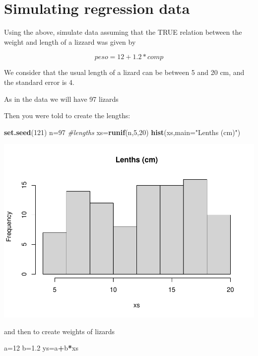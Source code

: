 \documentclass[
]{book}
\newenvironment{Shaded}{\begin{snugshade}}{\end{snugshade}}
\newcommand{\CommentTok}[1]{\textcolor[rgb]{0.56,0.35,0.01}{\textit{#1}}}
\newcommand{\DataTypeTok}[1]{\textcolor[rgb]{0.13,0.29,0.53}{#1}}
\newcommand{\DecValTok}[1]{\textcolor[rgb]{0.00,0.00,0.81}{#1}}
\newcommand{\FloatTok}[1]{\textcolor[rgb]{0.00,0.00,0.81}{#1}}
\newcommand{\KeywordTok}[1]{\textcolor[rgb]{0.13,0.29,0.53}{\textbf{#1}}}
\newcommand{\NormalTok}[1]{#1}
\newcommand{\OperatorTok}[1]{\textcolor[rgb]{0.81,0.36,0.00}{\textbf{#1}}}
\newcommand{\StringTok}[1]{\textcolor[rgb]{0.31,0.60,0.02}{#1}}
\begin{document}
\hypertarget{simulating-regression-data}{%
\section{Simulating regression data}\label{simulating-regression-data}}

Using the above, simulate data assuming that the TRUE relation between the weight and length of a lizzard was given by

\[ peso = 12 + 1.2 * comp \]

We consider that the usual length of a lizard can be between 5 and 20 cm, and the standard error is 4.

As in the data we will have 97 lizards

Then you were told to create the lengths:

\begin{Shaded}
\begin{Highlighting}[]
\KeywordTok{set.seed}\NormalTok{(}\DecValTok{121}\NormalTok{)}
\NormalTok{n=}\DecValTok{97}
\CommentTok{#lengths}
\NormalTok{xs=}\KeywordTok{runif}\NormalTok{(n,}\DecValTok{5}\NormalTok{,}\DecValTok{20}\NormalTok{)}
\KeywordTok{hist}\NormalTok{(xs,}\DataTypeTok{main=}\StringTok{"Lenths (cm)"}\NormalTok{)}
\end{Highlighting}
\end{Shaded}

\includegraphics{ECOMODbook_files/figure-latex/a6.21-1.pdf}

and then to create weights of lizards

\begin{Shaded}
\begin{Highlighting}[]
\NormalTok{a=}\DecValTok{12}
\NormalTok{b=}\FloatTok{1.2}
\NormalTok{ys=a}\OperatorTok{+}\NormalTok{b}\OperatorTok{*}\NormalTok{xs}
\end{Highlighting}
\end{Shaded}
\end{document}
